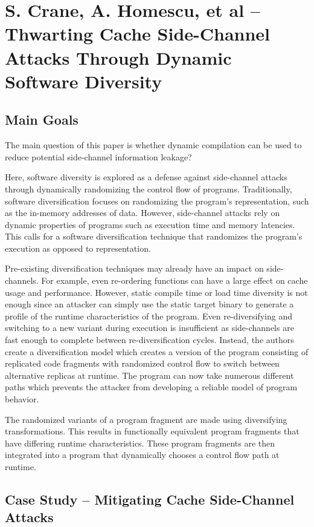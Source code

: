 
\section{S. Crane, A. Homescu, et al -- Thwarting Cache Side-Channel Attacks Through Dynamic Software Diversity}

\subsection{Main Goals}
The main question of this paper is whether dynamic compilation can be used to reduce potential side-channel information leakage?

Here, software diversity is explored as a defense against side-channel attacks
through dynamically randomizing the control flow of programs. Traditionally,
software diversification focuses on randomizing the program's representation,
such as the in-memory addresses of data. However, side-channel attacks rely on
dynamic properties of programs such as execution time and memory latencies.
This calls for a software diversification technique that randomizes the
program's execution as opposed to representation. 

Pre-existing diversification techniques may already have an impact on side-channels. For example, even re-ordering functions can have a large effect on
cache usage and performance. However, static compile time or load time
diversity is not enough since an attacker can simply use the static target
binary to generate a profile of the runtime characteristics of the program.
Even re-diversifying and switching to a new variant during execution is
insufficient as side-channels are fast enough to complete between
re-diversification cycles. Instead, the authors create a diversification model
which creates a version of the program consisting of replicated code fragments
with randomized control flow to switch between alternative replicas at runtime.
The program can now take numerous different paths which prevents the attacker
from developing a reliable model of program behavior. 

The randomized variants of a program fragment are made using diversifying 
transformations. This results in functionally equivalent program fragments that
have differing runtime characteristics. These program fragments are then
integrated into a program that dynamically chooses a control flow path at
runtime. 

\subsection{Case Study -- Mitigating Cache Side-Channel Attacks}

